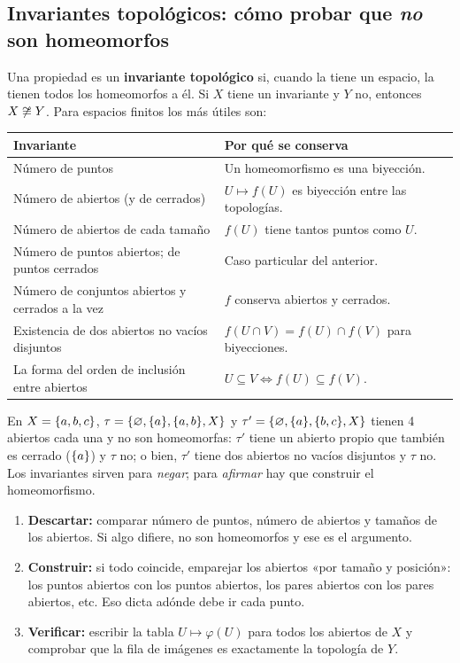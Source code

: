 \subsection{Invariantes topológicos: cómo probar que \emph{no} son homeomorfos}
Una propiedad es un \textbf{invariante topológico} si, cuando la tiene un espacio, la tienen todos los homeomorfos a
él. Si $X$ tiene un invariante y $Y$ no, entonces $X\not\cong Y$. Para espacios finitos los más útiles son:
\begin{center}\small\renewcommand{\arraystretch}{1.25}
\begin{tabular}{@{}p{6.4cm}p{9.0cm}@{}}\toprule
\textbf{Invariante} & \textbf{Por qué se conserva}\\ \midrule
Número de puntos & Un homeomorfismo es una biyección.\\
Número de abiertos (y de cerrados) & $U\mapsto f(U)$ es biyección entre las topologías.\\
Número de abiertos de cada tamaño & $f(U)$ tiene tantos puntos como $U$.\\
Número de puntos abiertos; de puntos cerrados & Caso particular del anterior.\\
Número de conjuntos abiertos y cerrados a la vez & $f$ conserva abiertos y cerrados.\\
Existencia de dos abiertos no vacíos disjuntos & $f(U\cap V)=f(U)\cap f(V)$ para biyecciones.\\
La forma del orden de inclusión entre abiertos & $U\subseteq V\iff f(U)\subseteq f(V)$.\\ \bottomrule
\end{tabular}\end{center}

\begin{ojo}
En $X=\{a,b,c\}$, $\tau=\{\varnothing,\{a\},\{a,b\},X\}$ y $\tau'=\{\varnothing,\{a\},\{b,c\},X\}$ tienen 4 abiertos cada una y no son
homeomorfas: $\tau'$ tiene un abierto propio que también es cerrado ($\{a\}$) y $\tau$ no; o bien, $\tau'$ tiene dos
abiertos no vacíos disjuntos y $\tau$ no. Los invariantes sirven para \emph{negar}; para \emph{afirmar} hay que
construir el homeomorfismo.
\end{ojo}

\begin{metodo}
\begin{enumerate}[leftmargin=1.6em]
\item \textbf{Descartar:} comparar número de puntos, número de abiertos y tamaños de los abiertos. Si algo difiere,
no son homeomorfos y ese es el argumento.
\item \textbf{Construir:} si todo coincide, emparejar los abiertos «por tamaño y posición»: los puntos abiertos con
los puntos abiertos, los pares abiertos con los pares abiertos, etc. Eso dicta adónde debe ir cada punto.
\item \textbf{Verificar:} escribir la tabla $U\mapsto\varphi(U)$ para todos los abiertos de $X$ y comprobar que la
fila de imágenes es exactamente la topología de $Y$.
\end{enumerate}
\end{metodo}

